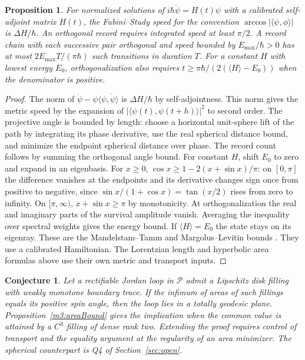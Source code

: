 \documentclass[11pt,reqno]{amsart}
\newtheorem{proposition}[theorem]{Proposition}
\newtheorem{conjecture}[theorem]{Conjecture}
\theoremstyle{definition}
\theoremstyle{remark}
\numberwithin{equation}{section}
\begin{document}
\begin{proposition}\label{m3:timing}
For normalized solutions of
\(i\hbar\dot\psi=H(t)\psi\) with a calibrated self-adjoint matrix
\(H(t)\), the Fubini--Study speed for the convention
\(\arccos|\langle\psi,\phi\rangle|\) is \(\Delta H/\hbar\).
An orthogonal record requires integrated speed at least \(\pi/2\).
A record chain with each successive pair orthogonal and speed
bounded by \(E_{\max}/\hbar>0\) has at most
\(2E_{\max}T/(\pi\hbar)\) such transitions in duration \(T\).
For a constant \(H\) with lowest energy \(E_0\), orthogonalization
also requires \(t\ge\pi\hbar/(2(\langle H\rangle-E_0))\)
when the denominator is positive.
\end{proposition}
\begin{proof}
The norm of
\(\dot\psi-\psi\langle\psi,\dot\psi\rangle\) is
\(\Delta H/\hbar\) by self-adjointness. This norm gives
the metric speed by the expansion of
\(|\langle\psi(t),\psi(t+h)\rangle|^2\) to second order.
The projective angle is bounded by length: choose a horizontal
unit-sphere lift of the path by integrating its phase derivative,
use the real spherical distance bound, and minimize the
endpoint spherical distance over phase. The record count follows
by summing the orthogonal angle bound. For constant \(H\),
shift \(E_0\) to zero and expand in an eigenbasis. For \(x\ge0\),
\(\cos x\ge 1-2(x+\sin x)/\pi\): on \([0,\pi]\) the difference
vanishes at the endpoints and its derivative changes sign once
from positive to negative, since
\(\sin x/(1+\cos x)=\tan(x/2)\) rises from zero to infinity.
On \([\pi,\infty)\), \(x+\sin x\ge\pi\) by monotonicity.
At orthogonalization the real and imaginary parts of the survival
amplitude vanish. Averaging the inequality over spectral weights
gives the energy bound. If \(\langle H\rangle=E_0\) the state
stays on its eigenray. These are the Mandelstam--Tamm and
Margolus--Levitin bounds \cite{m3MT,m3ML}. They use a calibrated
Hamiltonian. The Lorentzian length and hyperbolic area formulas
above use their own metric and transport inputs.
\end{proof}

\begin{conjecture}\label{m3:leastArea}
Let a rectifiable Jordan loop in \(\mathcal P\) admit a Lipschitz disk
filling with weakly monotone boundary trace. If the infimum of
areas of such fillings equals its positive spin angle, then the
loop lies in a totally geodesic plane. Proposition~\ref{m3:areaBound}
gives the implication when the common value is attained by a
\(C^3\) filling of dense rank two. Extending the proof requires
control of transport and the equality argument at the regularity
of an area minimizer.  The spherical counterpart is Q4 of Section~\ref{sec:open}.
\end{conjecture}
\end{document}
